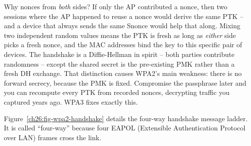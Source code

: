 \begin{intuitionbox}
Why nonces from \emph{both} sides? If only the AP contributed a nonce, then two
sessions where the AP happened to reuse a nonce would derive the same PTK -- and a
device that always sends the same Snonce would help that along. Mixing two
independent random values means the PTK is fresh as long as \emph{either} side
picks a fresh nonce, and the MAC addresses bind the key to this specific pair of
devices. The handshake is a Diffie-Hellman in spirit -- both parties contribute
randomness -- except the shared secret is the pre-existing PMK rather than a fresh
DH exchange. That distinction causes WPA2's main weakness: there is no
forward secrecy, because the PMK is fixed. Compromise the passphrase later and you
can recompute every PTK from recorded nonces, decrypting traffic you captured
years ago. WPA3 fixes exactly this.
\end{intuitionbox}

Figure~\ref{ch26:fig-wpa2-handshake} details the four-way handshake message ladder.
It is called ``four-way'' because four EAPOL (Extensible Authentication Protocol over LAN)
frames cross the link.

